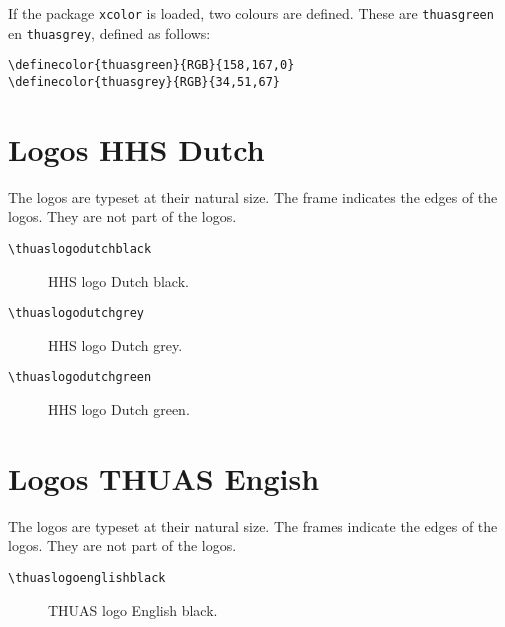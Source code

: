 \documentclass[a4paper,12pt]{article}
\begin{document}
If the package \verb|xcolor| is loaded, two colours are defined. These are
\verb|thuasgreen| en \verb|thuasgrey|, defined as follows:

\begin{verbatim}
\definecolor{thuasgreen}{RGB}{158,167,0}
\definecolor{thuasgrey}{RGB}{34,51,67}
\end{verbatim}


\section{Logos HHS Dutch}
The logos are typeset at their natural size. The frame indicates the edges of the logos.
They are not part of the logos.

\begin{verbatim}
\thuaslogodutchblack
\end{verbatim}

\begin{figure}[H]
\centering\fboxsep=0pt%
\fbox{%
\thuaslogodutchblack}
\caption{HHS logo Dutch black.}
\end{figure}

\begin{verbatim}
\thuaslogodutchgrey
\end{verbatim}

\begin{figure}[H]
\centering\fboxsep=0pt%
\fbox{%
\thuaslogodutchgrey}
\caption{HHS logo Dutch grey.}
\end{figure}

\begin{verbatim}
\thuaslogodutchgreen
\end{verbatim}

\begin{figure}[H]
\centering\fboxsep=0pt%
\fbox{%
\thuaslogodutchgreen}
\caption{HHS logo Dutch green.}
\end{figure}


\section{Logos THUAS Engish}
The logos are typeset at their natural size. The frames indicate the edges of the logos.
They are not part of the logos.

\begin{verbatim}
\thuaslogoenglishblack
\end{verbatim}

\begin{figure}[H]
\centering\fboxsep=0pt%
\fbox{%
\thuaslogoenglishblack}
\caption{THUAS logo English black.}
\end{figure}
\end{document}
